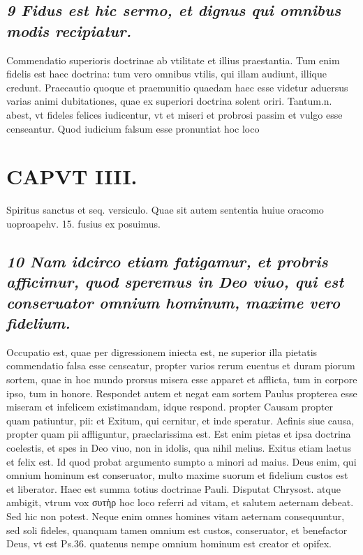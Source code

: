 \documentclass{article}
\begin{document}
\begin{pages}
\subsection*{\textit{9 Fidus est hic sermo, et dignus qui omnibus modis recipiatur. }}\pstart Commendatio superioris doctrinae ab vtilitate et illius praestantia. Tum enim fidelis est haec doctrina: tum vero omnibus vtilis, qui illam audiunt, illique  credunt. Praecautio quoque  et praemunitio quaedam haec esse videtur aduersus varias animi dubitationes, quae ex superiori doctrina solent oriri. Tantum.n. abest, vt fideles felices iudicentur, vt et miseri et probrosi passim et vulgo esse censeantur. Quod iudicium falsum esse pronuntiat hoc loco  \pend
\section*{CAPVT  IIII. }
\marginpar{[ p.223 ]}\pstart Spiritus sanctus et seq. versiculo. Quae sit autem sententia huiue oracomo uoproapehv. 15. fusius ex posuimus.  \pend
{}
{}
\subsection*{\textit{10 Nam idcirco etiam fatigamur, et probris afficimur, quod speremus in Deo viuo, qui est conseruator omnium hominum, maxime vero fidelium. }}\pstart Occupatio est, quae per digressionem iniecta est, ne superior illa pietatis commendatio falsa esse censeatur, propter varios rerum euentus et duram piorum sortem, quae in hoc mundo prorsus misera esse apparet et afflicta, tum in corpore ipso, tum in honore. Respondet autem et negat eam sortem Paulus propterea esse miseram et infelicem existimandam, idque respond. propter Causam propter quam patiuntur, pii: et Exitum, qui cernitur, et inde speratur. Acfinis siue causa, propter quam pii affliguntur, praeclarissima est. Est enim pietas et ipsa doctrina coelestis, et spes in Deo viuo, non in idolis, qua nihil melius.  \pend\pstart Exitus etiam laetus et felix est. Id quod probat argumento sumpto a minori ad maius. Deus enim, qui omnium hominum est conseruator, multo maxime suorum et fidelium custos est et liberator. Haec est summa totius doctrinae Pauli. Disputat Chrysost. atque ambigit, vtrum vox συτὴρ hoc loco referri ad vitam, et salutem aeternam debeat. Sed hic non potest. Neque enim omnes homines vitam aeternam consequuntur, sed soli fideles, quanquam tamen omnium est custos, conseruator, et benefactor Deus, vt est Ps.36. quatenus nempe omnium hominum est creator et opifex.  \pend

\end{pages}
\end{document}
